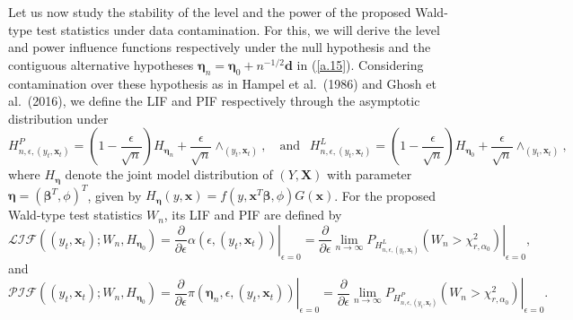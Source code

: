 \documentclass[a4paper]{article}%
\begin{document}
Let us now study the stability of the level and the power of the proposed
Wald-type test statistics under data contamination. For this, we will derive
the level and power influence functions respectively under the null hypothesis
and the contiguous alternative hypotheses $\boldsymbol{\eta}_{n}=\boldsymbol{\eta}%
_{0}+n^{-1/2}\boldsymbol{d}$ in (\ref{a.15}). Considering contamination over
these hypothesis as in Hampel et al.~(1986) and Ghosh et al.~(2016), we define
the LIF and PIF respectively through the asymptotic distribution under
\[
H_{n,\epsilon,(y_{t},\boldsymbol{x}_{t})}^{P}=(1-\frac{\epsilon}{\sqrt{n}%
})H_{\boldsymbol{\eta}_{n}}+\frac{\epsilon}{\sqrt{n}}\wedge_{(y_{t}%
,\boldsymbol{x}_{t})},~~~\mbox{ and } ~~H_{n,\epsilon,(y_{t},\boldsymbol{x}%
_{t})}^{L}=(1-\frac{\epsilon}{\sqrt{n}})H_{\boldsymbol{\eta}_{0}}%
+\frac{\epsilon}{\sqrt{n}}\wedge_{(y_{t},\boldsymbol{x}_{t})},
\]
where $H_{\boldsymbol{\eta}}$ denote the joint model distribution of
$(Y,\boldsymbol{X})$ with parameter $\boldsymbol{\eta}=(\boldsymbol{\beta}%
^{T}, \phi)^{T}$, given by $H_{\boldsymbol{\eta}}(y,\boldsymbol{x}%
)=f(y,\boldsymbol{x}^{T}\boldsymbol{\beta}, \phi)G(\boldsymbol{x})$. For the
proposed Wald-type test statistics $W_{n}$, its LIF and PIF are defined by
\[
\mathcal{LIF}((y_{t},\boldsymbol{x}_{t}); W_{n},H_{\boldsymbol{\eta}_{0}})
=\left.  \dfrac{\partial}{\partial\epsilon}\alpha(\epsilon,(y_{t}%
,\boldsymbol{x}_{t}))\right\vert _{\epsilon=0} = \left.  \dfrac{\partial
}{\partial\epsilon} \lim\limits_{n\rightarrow\infty}P_{H_{n,\epsilon
,(y_{t},\boldsymbol{x}_{t})}^{L}}(W_{n}>\chi_{r,\alpha_0}^{2}) \right\vert
_{\epsilon=0},
\]
and
\[
\mathcal{PIF}((y_{t},\boldsymbol{x}_{t}); W_{n},H_{\boldsymbol{\eta}_{0}})
=\left.  \dfrac{\partial}{\partial\epsilon}\pi(\boldsymbol{\eta}_{n}%
,\epsilon,(y_{t},\boldsymbol{x}_{t}))\right\vert _{\epsilon=0} =\left.
\dfrac{\partial}{\partial\epsilon} \lim\limits_{n\rightarrow\infty
}P_{H_{n,\epsilon,(y_{t},\boldsymbol{x}_{t})}^{P}}(W_{n}>\chi_{r,\alpha_0}^{2})
\right\vert _{\epsilon=0}.
\]
%
\end{document}
